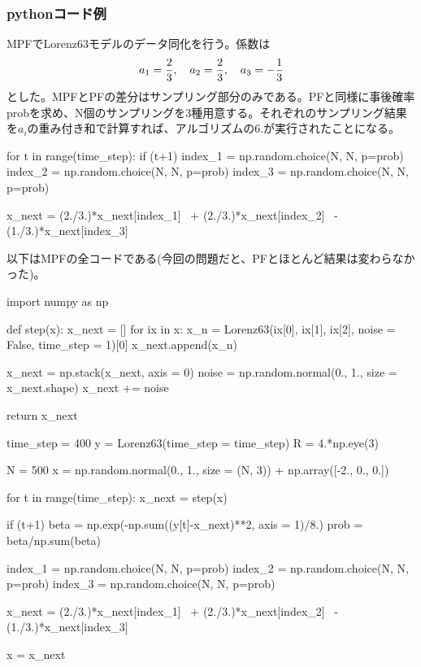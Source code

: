 \documentclass[dvipdfmx, 9pt, a4paper]{jsarticle}
\begin{document}
\subsubsection{pythonコード例}
MPFでLorenz63モデルのデータ同化を行う。係数は
\begin{equation}
a_1=\frac{2}{3},~~~a_2=\frac{2}{3},~~~a_3=-\frac{1}{3} \notag
\end{equation}
とした。MPFとPFの差分はサンプリング部分のみである。PFと同様に事後確率probを求め、N個のサンプリングを3種用意する。それぞれのサンプリング結果を$a_i$の重み付き和で計算すれば、アルゴリズムの6.が実行されたことになる。\bigskip
\begin{python}
for t in range(time_step):
	if (t+1)%
		index_1 = np.random.choice(N, N, p=prob)
		index_2 = np.random.choice(N, N, p=prob)
		index_3 = np.random.choice(N, N, p=prob)

		x_next = (2./3.)*x_next[index_1] \
			 + (2./3.)*x_next[index_2] \
			 - (1./3.)*x_next[index_3]
\end{python}\bigskip
以下はMPFの全コードである(今回の問題だと、PFとほとんど結果は変わらなかった)。\bigskip
\begin{python}
import numpy as np


def step(x):
	x_next = []
	for ix in x:
		x_n = Lorenz63(ix[0], ix[1], ix[2], noise = False, time_step = 1)[0]
		x_next.append(x_n)

	x_next = np.stack(x_next, axis = 0)
	noise = np.random.normal(0., 1., size = x_next.shape)
	x_next += noise

	return x_next

time_step = 400
y = Lorenz63(time_step = time_step)
R = 4.*np.eye(3)

N = 500
x = np.random.normal(0., 1., size = (N, 3)) + np.array([-2., 0., 0.])

for t in range(time_step):
	x_next = step(x)

	if (t+1)%
		beta = np.exp(-np.sum((y[t]-x_next)**2, axis = 1)/8.)
		prob = beta/np.sum(beta)

		index_1 = np.random.choice(N, N, p=prob)
		index_2 = np.random.choice(N, N, p=prob)
		index_3 = np.random.choice(N, N, p=prob)
		
		x_next = (2./3.)*x_next[index_1] \
			 + (2./3.)*x_next[index_2] \
			 - (1./3.)*x_next[index_3]

	x = x_next
\end{python}
\end{document}

